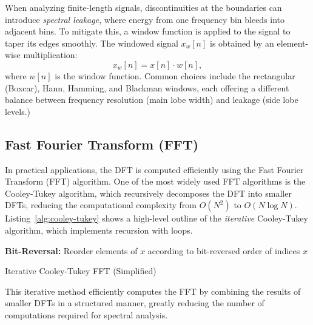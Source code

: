 \documentclass[12pt,letter]{article}
\begin{document}
When analyzing finite-length signals, discontinuities at the boundaries can
introduce \textit{spectral leakage}, where energy from one frequency bin
bleeds into adjacent bins. To mitigate this, a window function is applied to
the signal to taper its edges smoothly. The windowed signal $x_w[n]$ is
obtained by an element-wise multiplication:
\begin{equation}
x_w[n] = x[n] \cdot w[n],
\label{eqn:window}
\end{equation}
where $w[n]$ is the window function. Common choices include the rectangular
(Boxcar), Hann, Hamming, and Blackman windows, each offering a different
balance between frequency resolution (main lobe width) and leakage (side
lobe levels.)

\subsection{Fast Fourier Transform (FFT)}

In practical applications, the DFT is computed efficiently using the Fast
Fourier Transform (FFT) algorithm. One of the most widely used FFT algorithms
is the Cooley-Tukey algorithm, which recursively decomposes the DFT into
smaller DFTs, reducing the computational complexity from $O(N^2)$ to
$O(N \log N)$. Listing~\ref{alg:cooley-tukey} shows a high-level outline of
the \textit{iterative} Cooley-Tukey algorithm, which implements recursion
with loops.

\begin{algorithm}[H]
\SetAlgoLined
{}
\textbf{Bit-Reversal:} Reorder elements of \( x \) according to bit-reversed order of indices\;
\Return \( x \)\;
\caption{Iterative Cooley-Tukey FFT (Simplified)}
\label{alg:cooley-tukey}
\end{algorithm}

This iterative method efficiently computes the FFT by combining the results
of smaller DFTs in a structured manner, greatly reducing the number of
computations required for spectral analysis.
\end{document}
